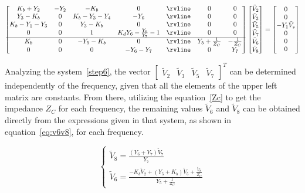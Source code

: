 \begin{equation}\label{step6}
  \begin{bmatrix}
    K_b+Y_2 & -Y_2 & -K_b & 0 & \rvline & 0 & 0 \\
    Y_3-K_b & 0 & K_b-Y_3-Y_4 & -Y_6 & \rvline & 0 & 0 \\
    K_b-Y_1-Y_3 & 0 & Y_3-K_b & 0 & \rvline & 0 & 0 \\
    0 & 0 & 1 & K_dY_6-\frac{Y_6}{Y_7}-1 & \rvline & 0 & 0\\
    \hline
    K_b & 0 & -Y_5-K_b & 0 & \rvline & Y_5+\frac{1}{Z_C} & -\frac{1}{Z_C}\\
    0 & 0 & 0 & -Y_6-Y_7 & \rvline & 0 & Y_7\\
  \end{bmatrix}
  \begin{bmatrix}
    \tilde{V}_2\\
    \tilde{V}_3\\
    \tilde{V}_5\\
    \tilde{V}_7\\
    \tilde{V}_6\\
    \tilde{V}_8\\
  \end{bmatrix}
  =
  \begin{bmatrix}
    0\\
    0\\
    -Y_1 \tilde{V}_{s}\\
    0\\
    0\\
    0\\
  \end{bmatrix}
\end{equation}

Analyzing the system~\ref{step6}, the vector $\begin{bmatrix} \tilde{V}_2 & \tilde{V}_3 & \tilde{V}_5 & \tilde{V}_7 \end{bmatrix}^T$ can be determined independently of the frequency, given that all the elements of the upper left matrix are constants. From there, utilizing the equation~\ref{Zc} to get the impedance $Z_C$ for each frequency, the remaining values $\tilde{V}_6$ and $\tilde{V}_8$ can be obtained directly from the expressions given in that system, as shown in equation~\ref{eq:v6v8}, for each frequency. 

\begin{equation}
    \label{eq:v6v8}
    \begin{cases}
    \tilde{V}_8 = \frac{\left( Y_6 + Y_7\right)\tilde{V}_7}{Y_7} \\
    \tilde{V}_6 = \frac{-K_b\tilde{V}_2 + \left( Y_5+K_b\right)\tilde{V}_5 + \frac{\tilde{V}_8}{Z_C}}{Y_5+\frac{1}{Z_C}}
    \end{cases}
\end{equation}


